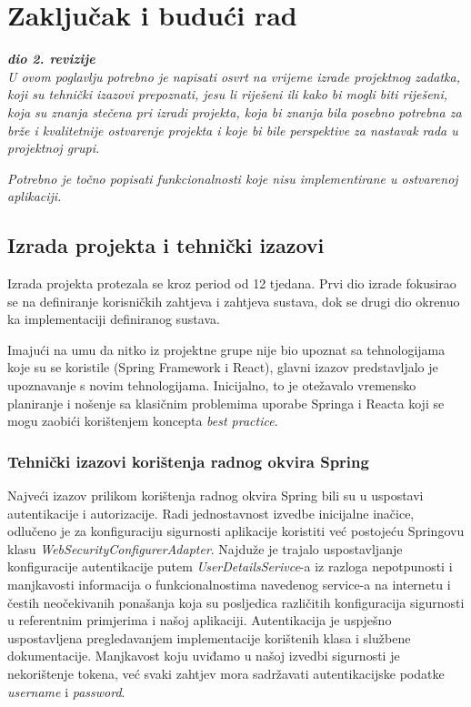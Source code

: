 \chapter{Zaključak i budući rad}
		
		\textbf{\textit{dio 2. revizije}}\\
		
		 \textit{U ovom poglavlju potrebno je napisati osvrt na vrijeme izrade projektnog zadatka, koji su tehnički izazovi prepoznati, jesu li riješeni ili kako bi mogli biti riješeni, koja su znanja stečena pri izradi projekta, koja bi znanja bila posebno potrebna za brže i kvalitetnije ostvarenje projekta i koje bi bile perspektive za nastavak rada u projektnoj grupi.}
		
		 \textit{Potrebno je točno popisati funkcionalnosti koje nisu implementirane u ostvarenoj aplikaciji.}
		 
		 \section{Izrada projekta i tehnički izazovi}
		 
		 Izrada projekta protezala se kroz period od 12 tjedana. Prvi dio izrade fokusirao se na definiranje korisničkih zahtjeva i zahtjeva sustava, dok se drugi dio okrenuo ka implementaciji definiranog sustava.
		 
		 Imajući na umu da nitko iz projektne grupe nije bio upoznat sa tehnologijama koje su se koristile (Spring Framework i React), glavni izazov predstavljalo je upoznavanje s novim tehnologijama. \newline
		 Inicijalno, to je otežavalo vremensko planiranje i nošenje sa klasičnim problemima uporabe Springa i Reacta koji se mogu zaobići korištenjem koncepta \textit{best practice}. \newline 
		 
		 \subsection{Tehnički izazovi korištenja radnog okvira Spring}
		 Najveći izazov prilikom korištenja radnog okvira Spring bili su u uspostavi autentikacije i autorizacije. Radi jednostavnost izvedbe inicijalne inačice, odlučeno je za konfiguraciju sigurnosti aplikacije koristiti već postojeću Springovu klasu \textit{WebSecurityConfigurerAdapter}. Najduže je trajalo uspostavljanje konfiguracije autentikacije putem \textit{UserDetailsSerivce}-a iz razloga nepotpunosti i manjkavosti informacija o funkcionalnostima navedenog service-a na internetu i čestih neočekivanih ponašanja koja su posljedica različitih konfiguracija sigurnosti u referentnim primjerima i našoj aplikaciji. Autentikacija je uspješno uspostavljena pregledavanjem implementacije korištenih klasa i službene dokumentacije. 
		 Manjkavost koju uviđamo u našoj izvedbi sigurnosti je nekorištenje tokena, već svaki zahtjev mora sadržavati autentikacijske podatke \textit{username} i \textit{password}.
			 
